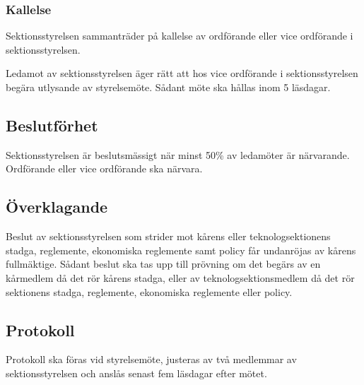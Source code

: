 \subsubsection{Kallelse}
Sektionsstyrelsen sammanträder på kallelse av ordförande eller vice ordförande i sektionsstyrelsen.

Ledamot av sektionsstyrelsen äger rätt att hos vice ordförande i sektionsstyrelsen begära utlysande av styrelsemöte.
Sådant möte ska hållas inom 5 läsdagar.
\subsection{Beslutförhet}
Sektionsstyrelsen är beslutsmässigt när minst 50\% av ledamöter är närvarande. Ordförande eller vice ordförande ska närvara.
\subsection{Överklagande}
Beslut av sektionsstyrelsen som strider mot kårens eller teknologsektionens stadga, reglemente, ekonomiska reglemente samt policy får undanröjas av kårens fullmäktige. Sådant beslut ska tas upp till prövning om det begärs av en kårmedlem då det rör kårens stadga, eller av teknologsektionsmedlem då det rör sektionens stadga, reglemente, ekonomiska reglemente eller policy.
\subsection{Protokoll}
Protokoll ska föras vid styrelsemöte, justeras av två medlemmar av
sektionsstyrelsen och anslås senast fem läsdagar efter mötet.

